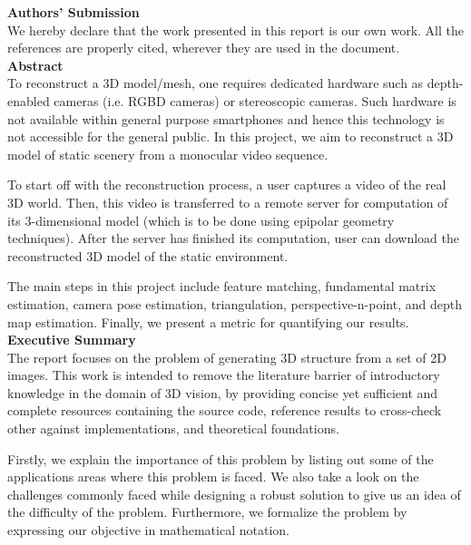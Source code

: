 \documentclass[11pt, a4paper, openany]{article}
\begin{document}

\noindent\textbf{Authors' Submission} \\

We hereby declare that the work presented in this report is our own work. All the references are properly cited, wherever they are used in the document.\\
\newline
\newline
\newline
\textbf{Abstract} \\
\newline
To reconstruct a 3D model/mesh, one requires dedicated hardware such as depth-enabled cameras (i.e. RGBD cameras) or stereoscopic cameras. Such hardware is not available within general purpose smartphones and hence this technology is not accessible for the general public. In this project, we aim to reconstruct a 3D model of static scenery from a monocular video sequence.

To start off with the reconstruction process, a user captures a video of the real 3D world. Then, this video is transferred to a remote server for computation of its 3-dimensional model (which is to be done using epipolar geometry techniques). After the server has finished its computation, user can download the reconstructed 3D model of the static environment.

The main steps in this project include feature matching, fundamental matrix estimation, camera pose estimation, triangulation, perspective-n-point, and depth map estimation. Finally, we present a metric for quantifying our results.\\

\newpage
\noindent\textbf{Executive Summary} \\
\newline
The report focuses on the problem of generating 3D structure from a set of 2D images. This work is intended to remove the literature barrier of introductory knowledge in the domain of 3D vision, by providing concise yet sufficient and complete resources containing the source code, reference results to cross-check other against implementations, and theoretical foundations. \newline

Firstly, we explain the importance of this problem by listing out some of the applications areas where this problem is faced. We also take a look on the challenges commonly faced while designing a robust solution to give us an idea of the difficulty of the problem. Furthermore, we formalize the problem by expressing our objective in mathematical notation. \newline
\end{document}
